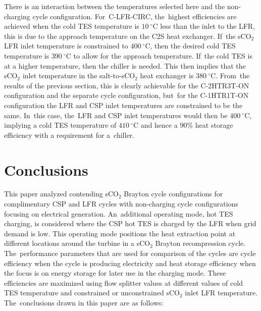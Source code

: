 \documentclass[sustainability,article,accept,moreauthors,pdftex]{Definitions/mdpi}
\begin{document}
\begin{paracol}{2}
There is an interaction between the temperatures selected here and the non-charging cycle configuration. For~C-LFR-CIRC, the~highest efficiencies are achieved when the cold TES temperature is $10~^{\circ}$C less than the inlet to the LFR, this is due to the approach temperature on the C2S heat exchanger. If~the sCO$_2$ LFR inlet temperature is constrained to $400~^{\circ}$C, then the desired cold TES temperature is $390~^{\circ}$C to allow for the approach temperature. If~the cold TES is at a higher temperature, then the chiller is needed. This then implies that the sCO$_2$ inlet temperature in the salt-to-sCO$_2$ heat exchanger is  $380~^{\circ}$C. From~the results of the previous section, this is clearly achievable for the C-2HTR3T-ON configuration and the separate cycle configuration, but~for the C-1HTR1T-ON configuration the LFR and CSP inlet temperatures are constrained to be the same. In~this case, the~LFR and CSP inlet temperatures would then be $400~^{\circ}$C, implying a cold TES temperature of  $410~^{\circ}$C and hence a 90\% heat storage efficiency with a requirement for a~chiller.


\section{Conclusions}

This paper analyzed contending sCO$_2$ Brayton cycle configurations for complimentary CSP and LFR cycles with non-charging cycle configurations focusing on electrical generation. An~additional operating mode, hot TES charging, is considered where the CSP hot TES is charged by the LFR when grid demand is low. This operating mode positions the heat extraction point at different locations around the turbine in a sCO$_2$ Brayton recompression cycle. The~performance parameters that are used for comparison of the cycles are cycle efficiency when the cycle is producing electricity and heat storage efficiency when the focus is on energy storage for later use in the charging mode. These efficiencies are maximized using flow splitter values at different values of cold TES temperature and constrained or unconstrained sCO$_2$ inlet LFR temperature. The~conclusions drawn in this paper are as follows:


\end{paracol}
\end{document}
